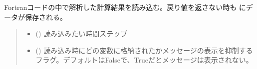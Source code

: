 \documentclass[letterpaper,10pt,dvipdfmx,report]{sphinxmanual}
\begin{document}
\begin{fulllineitems}
\label{\detokenize{io:R2D2.R2D2_data.read_vc}}
\pysigstartsignatures
{}
\pysigstopsignatures
\sphinxAtStartPar
Fortranコードの中で解析した計算結果を読み込む。戻り値を返さない時も {\hyperref[\detokenize{io:R2D2.R2D2_data.vc}]{}} にデータが保存される。
\begin{quote}\begin{description}
\begin{itemize}
\item {} 
\sphinxAtStartPar
{} () \sphinxhyphen{}\sphinxhyphen{} 読み込みたい時間ステップ

\item {} 
\sphinxAtStartPar
{} () \sphinxhyphen{}\sphinxhyphen{} 読み込み時にどの変数に格納されたかメッセージの表示を抑制するフラグ。デフォルトはFalseで、Trueだとメッセージは表示されない。

\end{itemize}

\end{description}\end{quote}

\end{fulllineitems}

\end{document}
